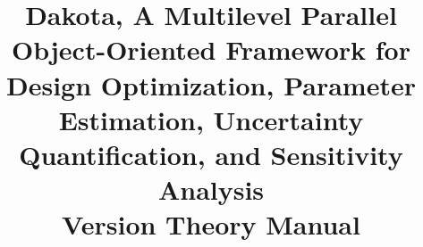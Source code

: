 \documentclass[ps2pdf,11pt,report]{SANDreport}
\title{Dakota, A Multilevel Parallel Object-Oriented Framework for 
Design Optimization, Parameter Estimation, Uncertainty Quantification, 
and Sensitivity Analysis\\\vspace{5mm}Version \DakotaVersion\space Theory Manual}
\author{\DakotaAuthorLong}
\begin{document}

\maketitle

\begin{abstract}
\DakotaAbstractShared
\DakotaAbstractTheory
\end{abstract}


\SANDmain 






\begin{SANDdistribution}[NM]





\end{SANDdistribution}

\end{document}
